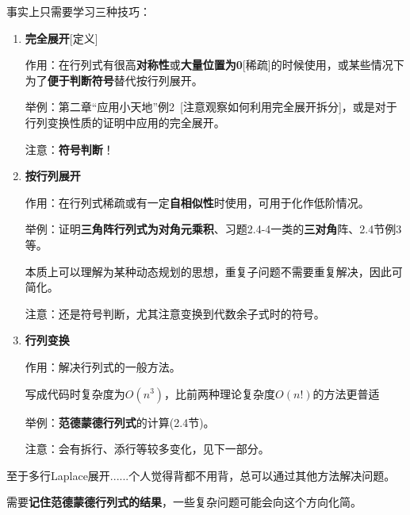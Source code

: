 \documentclass[a4paper,UTF8,fontset=windows]{ctexart}
\newcommand*{\note}{\noindent *}
\begin{document}
事实上只需要学习三种技巧：
\begin{enumerate}
    \item \textbf{完全展开}[定义]
    
    作用：在行列式有很高\textbf{对称性}或\textbf{大量位置为0}[稀疏]的时候使用，或某些情况下为了\textbf{便于判断符号}替代按行列展开。

    举例：第二章``应用小天地''例2\ [注意观察如何利用完全展开拆分]，或是对于行列变换性质的证明中应用的完全展开。

    注意：\textbf{符号判断}！
    
    \item \textbf{按行列展开}
    
    作用：在行列式稀疏或有一定\textbf{自相似性}时使用，可用于化作低阶情况。

    举例：证明\textbf{三角阵行列式为对角元乘积}、习题2.4-4一类的\textbf{三对角}阵、2.4节例3等。

    \note 本质上可以理解为某种动态规划的思想，重复子问题不需要重复解决，因此可简化。

    注意：还是符号判断，尤其注意变换到代数余子式时的符号。

    \item \textbf{行列变换}
    
    作用：解决行列式的一般方法。
    
    \note 写成代码时复杂度为$O(n^3)$，比前两种理论复杂度$O(n!)$的方法更普适

    举例：\textbf{范德蒙德行列式}的计算(2.4节)。

    注意：会有拆行、添行等较多变化，见下一部分。
\end{enumerate}

\note 至于多行Laplace展开......个人觉得背都不用背，总可以通过其他方法解决问题。

\note 需要\textbf{记住范德蒙德行列式的结果}，一些复杂问题可能会向这个方向化简。
\end{document}
